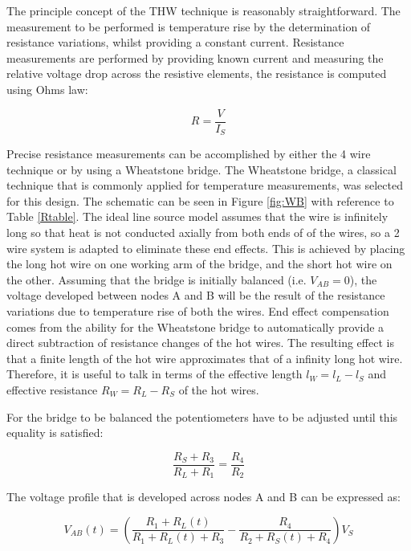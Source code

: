 \documentclass[12pt,MEng]{UoAThesis}
\begin{document}
The principle concept of the THW technique is reasonably straightforward. The measurement to be performed is temperature rise by the determination of resistance variations, whilst providing a constant current. Resistance measurements are performed by providing known current and measuring the relative voltage drop across the resistive elements, the resistance is computed using Ohms law:

\begin{equation} \label{eq:ideal}
R = \frac{V}{I_S}
\end{equation}


Precise resistance measurements can be accomplished by either the 4 wire technique or by using a Wheatstone bridge.
The Wheatstone bridge, a classical technique that is commonly applied for temperature measurements, was selected for this design. The schematic can be seen in Figure \ref{fig:WB} with reference to Table \ref{Rtable}. The ideal line source model assumes that the wire is infinitely long so that heat is not conducted axially from both ends of  of the wires, so a 2 wire system is adapted to eliminate these end effects. This is achieved by placing the long hot wire on one working arm of the bridge, and the short hot wire on the other. Assuming that the bridge is initially balanced (i.e. $V_{AB} = 0 $), the voltage developed between nodes A and B will be the result of the resistance variations due to temperature rise of both the wires. End effect compensation comes from the ability for the Wheatstone bridge to automatically provide a direct subtraction of resistance changes of the hot wires. The resulting effect is that a finite length of the hot wire approximates that of a infinity long hot wire. Therefore, it is useful to talk in terms of the effective length $l_W = l_L - l_S$ and effective resistance $R_W = R_L - R_S$ of the hot wires.

For the bridge to be balanced the potentiometers have to be adjusted until this equality is satisfied:

\begin{equation} \label{eq:balance}
\frac{R_S + R_3}{R_L + R_1} = \frac{R_4}{R_2}
\end{equation}

\noindent The voltage profile that is developed across nodes A and B can be expressed as:

	\begin{equation} \label{eq:V_wb}
V_{AB}(t) = \left( \frac{R_1 + R_L(t)}{R_1 + R_L(t) + R_3} - \frac{R_4}{R_2 + R_S(t) + R_4} \right) V_S
	\end{equation}
\end{document}
